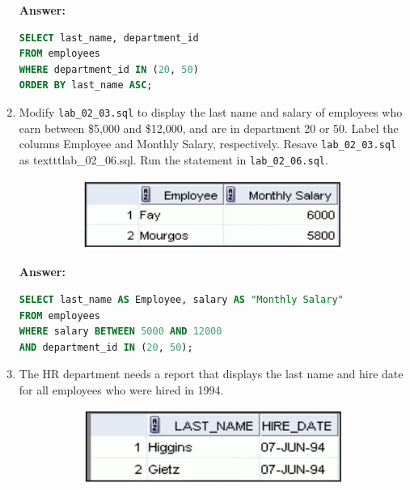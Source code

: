 \documentclass[a4paper,12pt]{article}
\begin{document}
\begin{enumerate}
    \textbf{Answer: }
    \begin{lstlisting}[language=SQL, label={lst:employees_data}]
SELECT last_name, department_id
FROM employees
WHERE department_id IN (20, 50)
ORDER BY last_name ASC;
    \end{lstlisting}
    \item Modify \texttt{lab\_02\_03.sql} to display the last name and salary of employees who earn between
\$5,000 and \$12,000, and are in department 20 or 50. Label the columns Employee and
Monthly Salary, respectively. Resave \texttt{lab\_02\_03.sql} as texttt{lab\_02\_06.sql}. Run the
statement in \texttt{lab\_02\_06.sql}.
\begin{figure}[h]
        \centering
        \begin{subfigure}[b]{0.35\linewidth}
            \centering
            \includegraphics[width=\linewidth]{graphics/26.png}
        \end{subfigure}
    \end{figure}        
    \newpage
    \textbf{Answer: }
    \begin{lstlisting}[language=SQL, label={lst:employees_data}]
SELECT last_name AS Employee, salary AS "Monthly Salary"
FROM employees
WHERE salary BETWEEN 5000 AND 12000
AND department_id IN (20, 50);
    \end{lstlisting}
    \item The HR department needs a report that displays the last name and hire date for all employees
who were hired in 1994.
\begin{figure}[h]
        \centering
        \begin{subfigure}[b]{0.35\linewidth}
            \centering
            \includegraphics[width=\linewidth]{graphics/27.png}
        \end{subfigure}
    \end{figure}        


\end{enumerate}
\end{document}
